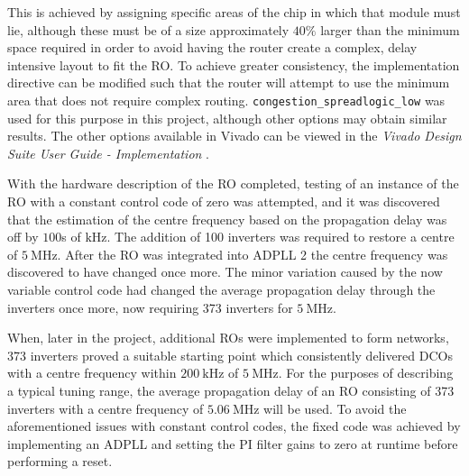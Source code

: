This is achieved by assigning specific areas of the chip in which that module must lie, although these must be of a size approximately $40\%$ larger than the minimum space required in order to avoid having the router create a complex, delay intensive layout to fit the \ac{RO}. To achieve greater consistency, the implementation directive can be modified such that the router will attempt to use the minimum area that does not require complex routing. \texttt{congestion\_spreadlogic\_low} was used for this purpose in this project, although other options may obtain similar results. The other options available in Vivado can be viewed in the \textit{Vivado Design Suite User Guide - Implementation} \cite{impl_ug}.

With the hardware description of the \ac{RO} completed, testing of an instance of the \ac{RO} with a constant control code of zero was attempted, and it was discovered that the estimation of the centre frequency based on the propagation delay was off by $100$s of $\si{\kilo\hertz}$. The addition of 100 inverters was required to restore a centre of $5~\si{\mega\hertz}$. After the \ac{RO} was integrated into \ac{ADPLL} 2 the centre frequency was discovered to have changed once more. The minor variation caused by the now variable control code had changed the average propagation delay through the inverters once more, now requiring 373 inverters for $5~\si{\mega\hertz}$.

When, later in the project, additional \ac{RO}s were implemented to form networks, 373 inverters proved a suitable starting point which consistently delivered \ac{DCO}s with a centre frequency within $200~\si{\kilo\hertz}$ of $5~\si{\mega\hertz}$. For the purposes of describing a typical tuning range, the average propagation delay of an \ac{RO} consisting of 373 inverters with a centre frequency of $5.06~\si{\mega\hertz}$ will be used. To avoid the aforementioned issues with constant control codes, the fixed code was achieved by implementing an \ac{ADPLL} and setting the \ac{PI} filter gains to zero at runtime before performing a reset.

